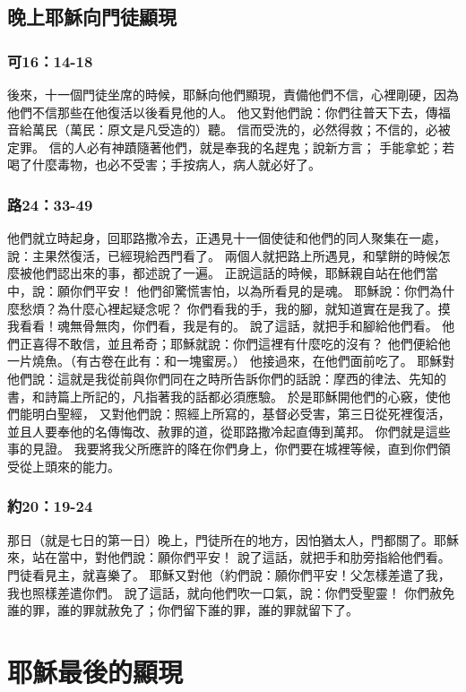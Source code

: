 \subsection{晚上耶穌向門徒顯現}
\subsubsection{可16：14-18}
後來，十一個門徒坐席的時候，耶穌向他們顯現，責備他們不信，心裡剛硬，因為他們不信那些在他復活以後看見他的人。
他又對他們說：你們往普天下去，傳福音給萬民（萬民：原文是凡受造的）聽。
信而受洗的，必然得救；不信的，必被定罪。
信的人必有神蹟隨著他們，就是奉我的名趕鬼；說新方言；
手能拿蛇；若喝了什麼毒物，也必不受害；手按病人，病人就必好了。


\subsubsection{路24：33-49}
他們就立時起身，回耶路撒冷去，正遇見十一個使徒和他們的同人聚集在一處，
說：主果然復活，已經現給西門看了。
兩個人就把路上所遇見，和擘餅的時候怎麼被他們認出來的事，都述說了一遍。
正說這話的時候，耶穌親自站在他們當中，說：願你們平安！
他們卻驚慌害怕，以為所看見的是魂。
耶穌說：你們為什麼愁煩？為什麼心裡起疑念呢？
你們看我的手，我的腳，就知道實在是我了。摸我看看！魂無骨無肉，你們看，我是有的。
說了這話，就把手和腳給他們看。
他們正喜得不敢信，並且希奇；耶穌就說：你們這裡有什麼吃的沒有？
他們便給他一片燒魚。（有古卷在此有：和一塊蜜房。）
他接過來，在他們面前吃了。
耶穌對他們說：這就是我從前與你們同在之時所告訴你們的話說：摩西的律法、先知的書，和詩篇上所記的，凡指著我的話都必須應驗。
於是耶穌開他們的心竅，使他們能明白聖經，
又對他們說：照經上所寫的，基督必受害，第三日從死裡復活，
並且人要奉他的名傳悔改、赦罪的道，從耶路撒冷起直傳到萬邦。
你們就是這些事的見證。
我要將我父所應許的降在你們身上，你們要在城裡等候，直到你們領受從上頭來的能力。

\subsubsection{約20：19-24}
那日（就是七日的第一日）晚上，門徒所在的地方，因怕猶太人，門都關了。耶穌來，站在當中，對他們說：願你們平安！
說了這話，就把手和肋旁指給他們看。門徒看見主，就喜樂了。
耶穌又對他（約們說：願你們平安！父怎樣差遣了我，我也照樣差遣你們。
說了這話，就向他們吹一口氣，說：你們受聖靈！
你們赦免誰的罪，誰的罪就赦免了；你們留下誰的罪，誰的罪就留下了。

\section{耶穌最後的顯現}

